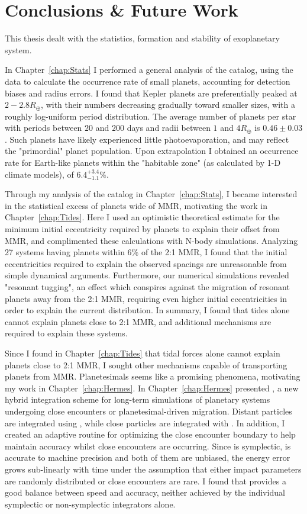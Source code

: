 \chapter{Conclusions \& Future Work}
This thesis dealt with the statistics, formation and stability of exoplanetary system. 

In Chapter~\ref{chap:Stats} I performed a general analysis of the \kep catalog, using the \citet{Ramirez2014} data to calculate the occurrence rate of small planets, accounting for detection biases and radius errors. 
I found that Kepler planets are preferentially peaked at $2-2.8R_\oplus$, with their numbers decreasing gradually toward smaller sizes, with a roughly log-uniform period distribution.
The average number of planets per star with periods between $20$ and $200$ days and radii between $1$ and $4R_\oplus$ is $0.46 \pm 0.03$. 
Such planets have likely experienced little photoevaporation, and may reflect the "primordial" planet population. 
Upon extrapolation I obtained an occurrence rate for Earth-like planets within the "habitable zone" (as calculated by 1-D climate models), of $6.4^{+3.4}_{-1.1}\%$. 

Through my analysis of the \kep catalog in Chapter~\ref{chap:Stats}, I became interested in the statistical excess of planets wide of MMR, motivating the work in Chapter~\ref{chap:Tides}.
Here I used an optimistic theoretical estimate for the minimum initial eccentricity required by \kep planets to explain their offset from MMR, and complimented these calculations with N-body simulations.
Analyzing 27 \kep systems having planets within $6\%$ of the 2:1 MMR, I found that the initial eccentricities required to explain the observed spacings are unreasonable from simple dynamical arguments.
Furthermore, our numerical simulations revealed "resonant tugging", an effect which conspires against the migration of resonant planets away from the 2:1 MMR, requiring even higher initial eccentricities in order to explain the current \kep distribution. 
In summary, I found that tides alone cannot explain planets close to 2:1 MMR, and additional mechanisms are required to explain these systems. 

Since I found in Chapter~\ref{chap:Tides} that tidal forces alone cannot explain planets close to 2:1 MMR, I sought other mechanisms capable of transporting planets from MMR. 
Planetesimals seems like a promising phenomena, motivating my work in Chapter~\ref{chap:Hermes}.
In Chapter~\ref{chap:Hermes} presented \hermes, a new hybrid integration scheme for long-term simulations of planetary systems undergoing close encounters or planetesimal-driven migration. 
Distant particles are integrated using \whfast, while close particles are integrated with \ias.
In addition, I created an adaptive routine for optimizing the close encounter boundary to help maintain accuracy whilst close encounters are occurring.
Since \whfast is symplectic, \ias is accurate to machine precision and both of them are unbiased, the energy error grows sub-linearly with time under the assumption that either impact parameters are randomly distributed or close encounters are rare.
I found that \hermes provides a good balance between speed and accuracy, neither achieved by the individual symplectic or non-symplectic integrators alone.

